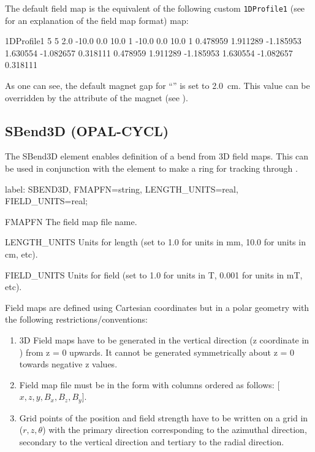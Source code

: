 The default field map is the equivalent of the following custom \texttt{1DProfile1} (see  for an explanation of the field map format) map:

\begin{example}
1DProfile1 5 5 2.0
 -10.0 0.0 10.0 1
 -10.0 0.0 10.0 1
  0.478959
  1.911289
 -1.185953
  1.630554
 -1.082657
  0.318111
  0.478959
  1.911289
 -1.185953
  1.630554
 -1.082657
  0.318111
\end{example}
As one can see, the default magnet gap for ``'' is set to \SI{2.0}{\centi\meter}. This value
can be overridden by the  attribute of the magnet (see ).

\clearpage

\subsection{SBend3D (OPAL-CYCL)} \label{ssec:SBend3D}
The SBend3D element enables definition of a bend from 3D field maps. This can be
used in conjunction with the  element to make a ring for
tracking through \opalcycl.

\begin{example}
label: SBEND3D, FMAPFN=string, LENGTH_UNITS=real, FIELD_UNITS=real;
\end{example}

\begin{kdescription}
\item[FMAPFN]
  The field map file name.
\item[LENGTH\_UNITS]
  Units for length (set to 1.0 for units in mm, 10.0 for units in cm, etc).
\item[FIELD\_UNITS]
  Units for field (set to 1.0 for units in T, 0.001 for units in mT, etc).
\end{kdescription}

Field maps are defined using Cartesian coordinates but in a polar geometry with the following restrictions/conventions:
\begin{enumerate}
\item	3D Field maps have to be generated in the vertical direction (z coordinate in \opalcycl) from z = 0 upwards. It cannot be generated symmetrically about z = 0 towards negative z values.
\item	Field map file must be in the form with columns ordered as follows: [$x, z, y, B_{x}, B_{z}, B_{y}$].
\item	Grid points of the position and field strength have to be written on a grid in ($r, z, \theta$) with the primary direction corresponding to the azimuthal direction, secondary to the vertical direction and tertiary to the radial direction.
\end{enumerate}

